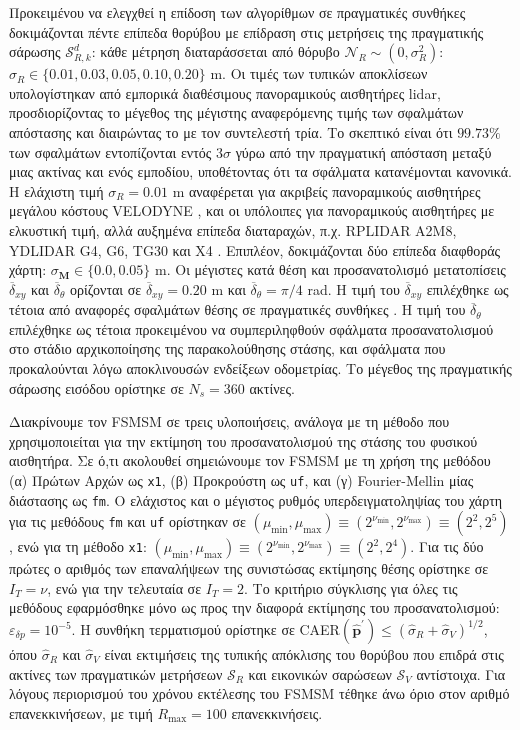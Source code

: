 Προκειμένου να ελεγχθεί η επίδοση των αλγορίθμων σε πραγματικές συνθήκες
δοκιμάζονται πέντε επίπεδα θορύβου με επίδραση στις μετρήσεις της πραγματικής
σάρωσης $\mathcal{S}_{R,k}^d$: κάθε μέτρηση διαταράσσεται από θόρυβο
$\mathcal{N}_{R} \sim (0, \sigma_{R}^2)$: $\sigma_R \in \{0.01, 0.03, 0.05,
0.10, 0.20\}$ m. Οι τιμές των τυπικών αποκλίσεων υπολογίστηκαν από εμπορικά
διαθέσιμους πανοραμικούς αισθητήρες lidar, προσδιορίζοντας το μέγεθος της
μέγιστης αναφερόμενης τιμής των σφαλμάτων απόστασης και διαιρώντας το με τον
συντελεστή τρία. Το σκεπτικό είναι ότι $99.73\%$ των σφαλμάτων εντοπίζονται
εντός $3\sigma$ γύρω από την πραγματική απόσταση μεταξύ μιας ακτίνας και ενός
εμποδίου, υποθέτοντας ότι τα σφάλματα κατανέμονται κανονικά. Η ελάχιστη τιμή
$\sigma_R = 0.01$ m αναφέρεται για ακριβείς πανοραμικούς αισθητήρες μεγάλου
κόστους VELODYNE \cite{velodyne_datasheet}, και οι υπόλοιπες για πανοραμικούς
αισθητήρες με ελκυστική τιμή, αλλά αυξημένα επίπεδα διαταραχών, π.χ. RPLIDAR
A2M8, YDLIDAR G4, G6, TG30 και X4 \cite{a2m8_datasheet,ydlidar}. Επιπλέον,
δοκιμάζονται δύο επίπεδα διαφθοράς χάρτη: $\sigma_{\bm{M}} \in \{0.0, 0.05\}$
m.  Οι μέγιστες κατά θέση και προσανατολισμό μετατοπίσεις
$\overline{\delta}_{xy}$ και $\overline{\delta}_{\theta}$ ορίζονται σε
$\overline{\delta}_{xy} = 0.20$ m και $\overline{\delta}_\theta = \pi / 4$ rad.
Η τιμή του $\overline{\delta}_{xy}$ επιλέχθηκε ως τέτοια από αναφορές σφαλμάτων
θέσης σε πραγματικές συνθήκες \cite{Peng2018a}. Η τιμή του
$\overline{\delta}_\theta$ επιλέχθηκε ως τέτοια προκειμένου να συμπεριληφθούν
σφάλματα προσανατολισμού στο στάδιο αρχικοποίησης της παρακολούθησης στάσης,
και σφάλματα που προκαλούνται λόγω αποκλινουσών ενδείξεων οδομετρίας. Το
μέγεθος της πραγματικής σάρωσης εισόδου ορίστηκε σε $N_s=360$ ακτίνες.

Διακρίνουμε τον FSMSM σε τρεις υλοποιήσεις, ανάλογα με τη μέθοδο που
χρησιμοποιείται για την εκτίμηση του προσανατολισμού της στάσης του φυσικού
αισθητήρα. Σε ό,τι ακολουθεί σημειώνουμε τον FSMSM με τη χρήση της μεθόδου (α)
Πρώτων Αρχών ως \texttt{x1}, (β) Προκρούστη ως \texttt{uf}, και (γ)
Fourier-Mellin μίας διάστασης ως \texttt{fm}. Ο ελάχιστος και ο μέγιστος ρυθμός
υπερδειγματοληψίας του χάρτη για τις μεθόδους \texttt{fm} και \texttt{uf}
ορίστηκαν σε $(\mu_{\min},\mu_{\max}) \equiv (2^{\nu_{\min}},2^{\nu_{\max}})
\equiv (2^2,2^5)$, ενώ για τη μέθοδο \texttt{x1}: $(\mu_{\min},\mu_{\max})
\equiv (2^{\nu_{\min}},2^{\nu_{\max}}) \equiv (2^2,2^4)$. Για τις δύο πρώτες ο
αριθμός των επαναλήψεων της συνιστώσας εκτίμησης θέσης ορίστηκε σε $I_T=\nu$,
ενώ για την τελευταία σε $I_T = 2$.  Το κριτήριο σύγκλισης για όλες τις
μεθόδους εφαρμόσθηκε μόνο ως προς την διαφορά εκτίμησης του προσανατολισμού:
$\varepsilon_{\delta p} = 10^{-5}$.  Η συνθήκη τερματισμού ορίστηκε σε
CAER$(\hat{\bm{p}}^\prime) \leq (\hat{\sigma}_R + \hat{\sigma}_V)^{1/2}$, όπου
$\hat{\sigma}_R$ και $\hat{\sigma}_V$ είναι εκτιμήσεις της τυπικής απόκλισης
του θορύβου που επιδρά στις ακτίνες των πραγματικών μετρήσεων $\mathcal{S}_R$
και εικονικών σαρώσεων $\mathcal{S}_V$ αντίστοιχα. Για λόγους περιορισμού του
χρόνου εκτέλεσης του FSMSM τέθηκε άνω όριο στον αριθμό επανεκκινήσεων, με τιμή
$R_{\max} = 100$ επανεκκινήσεις.

